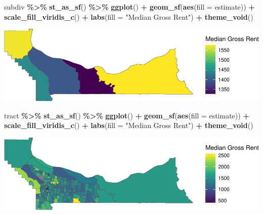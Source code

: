\documentclass[
]{article}
\newenvironment{Shaded}{\begin{snugshade}}{\end{snugshade}}
\newcommand{\AttributeTok}[1]{\textcolor[rgb]{0.13,0.29,0.53}{#1}}
\newcommand{\FunctionTok}[1]{\textcolor[rgb]{0.13,0.29,0.53}{\textbf{#1}}}
\newcommand{\NormalTok}[1]{#1}
\newcommand{\SpecialCharTok}[1]{\textcolor[rgb]{0.81,0.36,0.00}{\textbf{#1}}}
\newcommand{\StringTok}[1]{\textcolor[rgb]{0.31,0.60,0.02}{#1}}
\begin{document}
\begin{Shaded}
\begin{Highlighting}[]
\NormalTok{subdiv }\SpecialCharTok{\%\textgreater{}\%}
  \FunctionTok{st\_as\_sf}\NormalTok{() }\SpecialCharTok{\%\textgreater{}\%}
    \FunctionTok{ggplot}\NormalTok{() }\SpecialCharTok{+}
    \FunctionTok{geom\_sf}\NormalTok{(}\FunctionTok{aes}\NormalTok{(}\AttributeTok{fill =}\NormalTok{ estimate)) }\SpecialCharTok{+}
    \FunctionTok{scale\_fill\_viridis\_c}\NormalTok{() }\SpecialCharTok{+}
    \FunctionTok{labs}\NormalTok{(}\AttributeTok{fill =} \StringTok{"Median Gross Rent"}\NormalTok{) }\SpecialCharTok{+}
    \FunctionTok{theme\_void}\NormalTok{()}
\end{Highlighting}
\end{Shaded}

\includegraphics{lab06_files/figure-latex/unnamed-chunk-8-1.pdf}

\begin{Shaded}
\begin{Highlighting}[]
\NormalTok{tract }\SpecialCharTok{\%\textgreater{}\%}
  \FunctionTok{st\_as\_sf}\NormalTok{() }\SpecialCharTok{\%\textgreater{}\%}
    \FunctionTok{ggplot}\NormalTok{() }\SpecialCharTok{+}
    \FunctionTok{geom\_sf}\NormalTok{(}\FunctionTok{aes}\NormalTok{(}\AttributeTok{fill =}\NormalTok{ estimate)) }\SpecialCharTok{+}
    \FunctionTok{scale\_fill\_viridis\_c}\NormalTok{() }\SpecialCharTok{+}
    \FunctionTok{labs}\NormalTok{(}\AttributeTok{fill =} \StringTok{"Median Gross Rent"}\NormalTok{) }\SpecialCharTok{+}
    \FunctionTok{theme\_void}\NormalTok{()}
\end{Highlighting}
\end{Shaded}

\includegraphics{lab06_files/figure-latex/unnamed-chunk-8-2.pdf}
\end{document}
